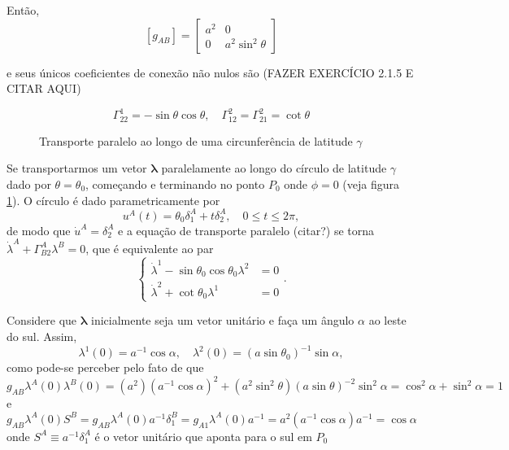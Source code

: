 Então, 
\[
\left[g_{A B}\right]=\left[\begin{array}{cc}{a^{2}} & {0} \\ {0} & {a^{2} \sin ^{2} \theta}\end{array}\right]
\]

e seus únicos coeficientes de conexão não nulos são {\color{red}(FAZER EXERCÍCIO 2.1.5 E CITAR AQUI)} 

\[
	\Gamma_{22}^{1}=-\sin \theta \cos \theta, \quad \Gamma_{12}^{2}=\Gamma_{21}^{2}=\cot \theta
\]

\begin{figure}[th]
	\centering
	\caption{Transporte paralelo ao longo de uma circunferência de latitude $\gamma$}
	\label{fig:EsferaTransporteParalelo}
\end{figure}



Se transportarmos um vetor $\boldsymbol{\lambda}$ paralelamente ao longo do círculo de latitude $\gamma$ dado por $\theta=\theta_0$, começando e terminando no ponto $P_0$ onde $\phi=0$ (veja figura \ref{fig:EsferaTransporteParalelo}). O círculo é dado parametricamente por
\[u^{A}(t)=\theta_{0} \delta_{1}^{A}+t \delta_{2}^{A}, \quad 0 \leq t \leq 2 \pi,\]
de modo que $\dot{u}^{A}=\delta_{2}^{A}$ e a equação de transporte paralelo {\color{red}(citar?)} se torna $\dot{\lambda}^{A}+\Gamma_{B 2}^{A} \lambda^{B}=0$, que é equivalente ao par
\begin{equation}\label{eq:EquacoesTransporteLambda}
\left\{\begin{aligned} \dot{\lambda}^{1}-\sin \theta_{0} \cos \theta_{0} \lambda^{2} &=0 \\ \dot{\lambda}^{2}+\cot \theta_{0} \lambda^{1} &=0 \end{aligned}\right. .
\end{equation}

Considere que $\boldsymbol{\lambda}$ inicialmente seja um vetor unitário e faça um ângulo $\alpha$ ao leste do sul. Assim,
\begin{equation}\label{eq:CondicoesIniciaisLambda}
	\lambda^{1}(0)=a^{-1} \cos \alpha, \quad \lambda^{2}(0)=\left(a \sin \theta_{0}\right)^{-1} \sin \alpha ,
\end{equation}
como pode-se perceber pelo fato de que
\[
	g_{AB}\lambda^A(0)\lambda^B(0)=(a^2)(a^{-1}\cos\alpha)^2+(a^2\sin^2\theta)(a\sin\theta)^{-2}\sin^2\alpha=\cos^2\alpha+\sin^2\alpha=1
\]
e
\[
	g_{AB}\lambda^A(0)S^B = g_{AB}\lambda^A(0)a^{-1}\delta^B_1=g_{A1}\lambda^A(0)a^{-1}=a^2(a^{-1}\cos\alpha)a^{-1}=\cos\alpha
\]
onde $S^A\equiv a^{-1}\delta^A_1$ é o vetor unitário que aponta para o sul em $P_0$

